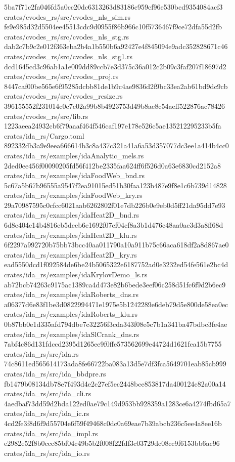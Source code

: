 \documentclass[
  10pt,
]{article}
\newenvironment{Shaded}{}{}
\newcommand{\NormalTok}[1]{#1}
\begin{document}
\begin{Shaded}
\begin{Highlighting}[]
\NormalTok{5ba7f71c2fa046fd5a0cc20dc6313263d83186c959cf96e530bcd9354084acf3  crates/cvodes\_rs/src/cvodes\_nls\_sim.rs}
\NormalTok{fe9e985d32d5504ee45513cdc9d0955f86b966c10f5736467f9ce72dfa55d2fb  crates/cvodes\_rs/src/cvodes\_nls\_stg.rs}
\NormalTok{dab2c7b9c2e012f363eba2b4a1b550b6a92427e4f845094e9adc352828671c46  crates/cvodes\_rs/src/cvodes\_nls\_stg1.rs}
\NormalTok{dcd1645cd3c96ab1a1e009dd89ccb7e3d375c36a012c2b09c3faf207f18697d2  crates/cvodes\_rs/src/cvodes\_proj.rs}
\NormalTok{8447caf00be565e6f95285dcbb81de1b9c4ae9836d2f9bc33ea2ab61bd9dc9cb  crates/cvodes\_rs/src/cvodes\_resize.rs}
\NormalTok{396155552f231014c0c7c02a99b8b4923753d49b8ae8c54aeff522876ac78426  crates/cvodes\_rs/src/lib.rs}
\NormalTok{1223aeea24932cb6f79aaaf464f546caf197e178e526c5ae135212295233b5fa  crates/ida\_rs/Cargo.toml}
\NormalTok{892332db3a9e9eea666614b3c8a437c321a41a6a53d357077dc3ee1a414b4cc0  crates/ida\_rs/examples/idaAnalytic\_mels.rs}
\NormalTok{2ded0ee456f00090205fd56f412be2335faa624ff6f526d0a63e6830cd2152a8  crates/ida\_rs/examples/idaFoodWeb\_bnd.rs}
\NormalTok{5c67a5b67b96555a9547f2ea91015ed51b30faa123b487e9f8e1c6b739d14828  crates/ida\_rs/examples/idaFoodWeb\_kry.rs}
\NormalTok{29a70987595c0cfcc6021aab6262802f01e7db226b0e9eb0d5ff21da95dd7e93  crates/ida\_rs/examples/idaHeat2D\_bnd.rs}
\NormalTok{6d8e404e14b4816cb5deeb6e1692f07ef04cf8a3b1d476c48aa0ac3d3a8ff68d  crates/ida\_rs/examples/idaHeat2D\_klu.rs}
\NormalTok{6f2297a992720b75bb73bcc40aa011790a10a911b75c66aca618df2a8d867ae0  crates/ida\_rs/examples/idaHeat2D\_kry.rs}
\NormalTok{ead5550dcd1f092584de6be24b5065322e6187752ad0e3232ed54fe561e2bc4d  crates/ida\_rs/examples/idaKrylovDemo\_ls.rs}
\NormalTok{ab72bcb74263c9175ac1389ca4d473e82b6bede3eef06c258d51fc6f9d2b6ec9  crates/ida\_rs/examples/idaRoberts\_dns.rs}
\NormalTok{a06377d6e83f1be3d0822994471e1975e5b1242289e6deb79d5e800de58ea0ec  crates/ida\_rs/examples/idaRoberts\_klu.rs}
\NormalTok{0b87bb0e1d335afd794dbe7c32256f3cda343f08e5c7b1a341ba47bdbc3fe4ae  crates/ida\_rs/examples/idaSlCrank\_dns.rs}
\NormalTok{7abf4c86d131fdccd2395d1265ee9f0ffe573562699e44724d1621fea15b7755  crates/ida\_rs/src/ida.rs}
\NormalTok{74c8611ed565614173ada8fe66722ba083a13d5e7df3fca5649701eab85cb999  crates/ida\_rs/src/ida\_bbdpre.rs}
\NormalTok{fb1479b08134db78e7f493d4e2c27ef5ec2448bce853817da400124c82a00a14  crates/ida\_rs/src/ida\_cli.rs}
\NormalTok{4aedbaf73dd59d2bda122ed0ae79c149d953bb928359a1283ce6a4274fbd65a7  crates/ida\_rs/src/ida\_ic.rs}
\NormalTok{4cd2fe3f8d6f9d55704e6f59f49468c0dc0a69eae7b39abcb236c5ee4a8ee16b  crates/ida\_rs/src/ida\_impl.rs}
\NormalTok{e2982e52f8b0ccc85bf04c49b5b2f008f22fdf3c03729dc08cc9f6153bb6ac96  crates/ida\_rs/src/ida\_io.rs}

\end{Highlighting}
\end{Shaded}
\end{document}

